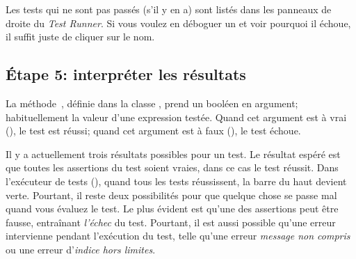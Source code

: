 \documentclass[a4paper,10pt,twoside]{book}
\begin{document}


Les tests qui ne sont pas passés (s'il y en a) sont listés dans les panneaux de droite du \emph{Test Runner}.
Si vous voulez en déboguer un et voir pourquoi il échoue, il suffit juste de cliquer sur le nom. 

\subsection{Étape 5: interpréter les résultats}

La méthode \,, définie dans la classe
, prend un booléen en argument; habituellement la valeur
d'une expression testée. Quand cet argument est à vrai (), le
test est réussi; quand cet argument est à faux (), le test échoue.  

Il y a actuellement trois résultats possibles pour un test. Le
résultat espéré est que toutes les assertions du test soient vraies,
dans ce cas le test réussit. Dans l'exécuteur de tests
(), quand tous les tests réussissent, la barre du haut
devient verte. Pourtant, il reste deux possibilités pour que quelque
chose se passe mal quand vous évaluez le test. Le plus évident est
qu'une des assertions peut être fausse, entraînant \emph{l'échec} du
test. Pourtant, il est aussi possible qu'une erreur intervienne
pendant l'exécution du test, telle qu'une erreur \emph{message non
  compris} ou une erreur 
d'\emph{indice hors limites}.
\end{document}

